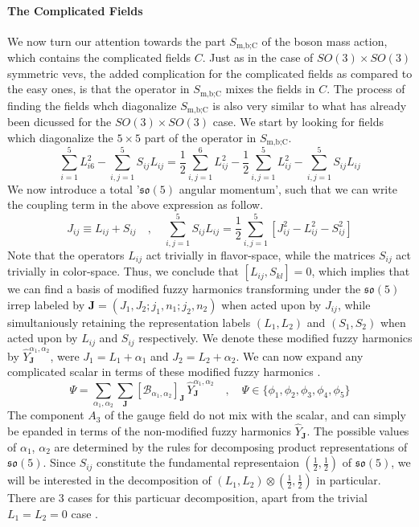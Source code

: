 \paragraph{The Complicated Fields}
We now turn our attention towards the part $S_{\text{m,b;C}}$ of the boson mass action, which contains the complicated fields $C$. Just as in the case of $SO(3) \times SO(3)$ symmetric vevs, the added complication for the complicated fields as compared to the easy ones, is that the operator in $S_{\text{m,b;C}}$ mixes the fields in $C$. The process of finding the fields whch diagonalize $S_{\text{m,b;C}}$ is also very similar to what has already been dicussed for the $SO(3) \times SO(3)$ case. We start by looking for fields which diagonalize the $5 \times 5$ part of the operator in $S_{\text{m,b;C}}$.
%
%
\begin{equation}\label{5x5 block operator}
\sum_{i=1}^5 L_{i6}^2
-
\sum_{i,j=1}^5 S_{ij} L_{ij}
=
\frac{1}{2} \sum_{i,j=1}^6 L_{ij}^2
-
\frac{1}{2} \sum_{i,j=1}^5 L_{ij}^2
-
\sum_{i,j=1}^5 S_{ij} L_{ij} 
\end{equation}
%
%
We now introduce a total '$\mathfrak{so}(5)$ angular momentum', such that we can write the coupling term in the above expression as follow.
%
%
\begin{equation}
J_{ij} \equiv L_{ij} + S_{ij}
%
\quad , \quad
%
\sum_{i,j=1}^5 S_{ij} L_{ij}
=
\frac{1}{2} \sum_{i,j=1}^5 \left[
J_{ij}^2 - L_{ij}^2 - S_{ij}^2
\right]
\end{equation}
%
%
Note that the operators $L_{ij}$ act trivially in flavor-space, while the matrices $S_{ij}$ act trivially in color-space. Thus, we conclude that $[L_{ij}, S_{kl}] = 0$, which implies that we can find a basis of modified fuzzy harmonics transforming under the $\mathfrak{so}(5)$ irrep labeled by $\mathbf{J} = (J_1, J_2; j_1, n_1; j_2, n_2)$ when acted upon by $J_{ij}$, while simultaniously retaining the representation labels $(L_1, L_2)$ and $(S_1, S_2)$ when acted upon by $L_{ij}$ and $S_{ij}$ respectively. We denote these modified fuzzy harmonics by $\hat{Y}^{\alpha_1, \alpha_2}_{\mathbf{J}}$, were $J_1 = L_1 + \alpha_1$ and $J_2 = L_2 + \alpha_2$. We can now expand any complicated scalar in terms of these modified fuzzy harmonics \cite{One-point functions in D3-D7 SO(5)}.
%
%
\begin{equation}
\Psi
=
\sum_{\alpha_1, \alpha_2} \sum_{\mathbf{J}}
[\mathcal{B}_{\alpha_1, \alpha_2}]_{\mathbf{J}} \,
\hat{Y}^{\alpha_1, \alpha_2}_{\mathbf{J}}
%
\quad , \quad
%
\Psi \in \{ \phi_1 , \phi_2 , \phi_3 , \phi_4 , \phi_5 \}
\end{equation}
%
%
The component $A_3$ of the gauge field do not mix with the scalar, and can simply be epanded in terms of the non-modified fuzzy harmonics $\hat{Y}_{\mathbf{J}}$. The possible values of $\alpha_1$, $\alpha_2$ are determined by the rules for decomposing product representations of $\mathfrak{so}(5)$. Since $S_{ij}$ constitute the fundamental representaion $(\tfrac{1}{2},\tfrac{1}{2})$ of $\mathfrak{so}(5)$, we will be interested in the decomposition of $(L_1, L_2) \otimes (\tfrac{1}{2},\tfrac{1}{2})$ in particular. There are $3$ cases for this particuar decomposition, apart from the trivial $L_1 = L_2 = 0$ case \cite{SO(5) and SO(6) rep theory, Lie groups and Lie algebras}.

